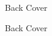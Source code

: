 \begin{figure}[H]
  {
    \begin{adjustbox}{width=10cm,center}
    \end{adjustbox}
  }\caption[]{Back Cover}
\end{figure}

\begin{figure}[H]
  {
    \begin{adjustbox}{width=10cm,center}
    \end{adjustbox}
  }\caption[]{Back Cover}
\end{figure}


